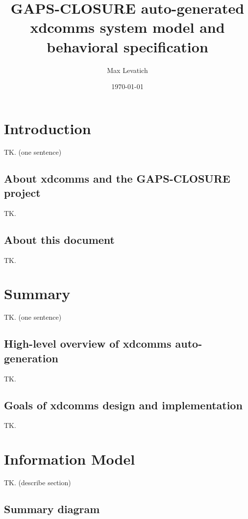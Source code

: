 \documentclass[11pt, oneside]{article}
\title{GAPS-CLOSURE auto-generated xdcomms system model and behavioral specification}
\author{Max Levatich}
\date{\today}
\begin{document}
    \maketitle
    \tableofcontents

    \section{Introduction}

        TK. (one sentence)

        \subsection{About xdcomms and the GAPS-CLOSURE project}

            TK.

        \subsection{About this document}

            TK.

    \section{Summary}

        TK. (one sentence)

        \subsection{High-level overview of xdcomms auto-generation}

            TK.

        \subsection{Goals of xdcomms design and implementation}

            TK.

    \section{Information Model}

        TK. (describe section)

        \subsection{Summary diagram}
\end{document}
